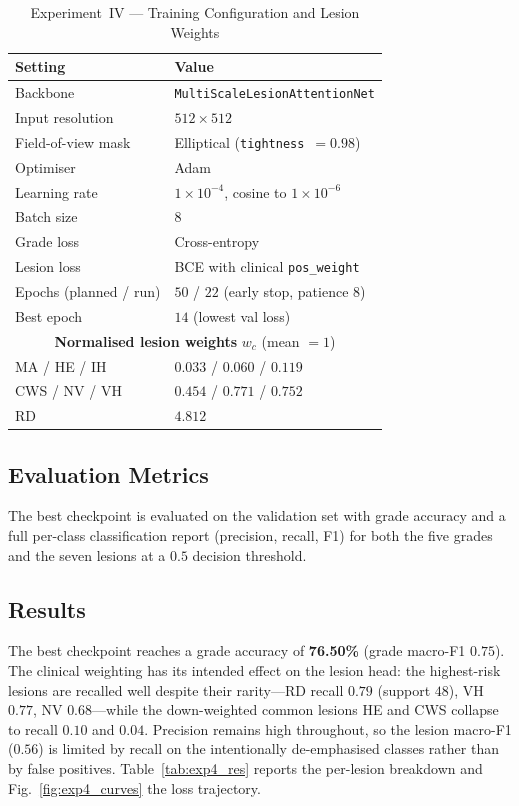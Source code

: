 \documentclass[journal,twoside,web]{ieeecolor}
\begin{document}
\begin{table}[!t]
\caption{Experiment~IV --- Training Configuration and Lesion Weights}
\label{tab:exp4_hyper}
\centering
\setlength{\tabcolsep}{5pt}
\begin{tabular}{|l|l|}
\hline
\textbf{Setting} & \textbf{Value} \\
\hline
Backbone & \texttt{MultiScaleLesionAttentionNet} \\
Input resolution & $512\times512$ \\
Field-of-view mask & Elliptical (\texttt{tightness}~$=0.98$) \\
Optimiser & Adam \\
Learning rate & $1\times10^{-4}$, cosine to $1\times10^{-6}$ \\
Batch size & $8$ \\
Grade loss & Cross-entropy \\
Lesion loss & BCE with clinical \texttt{pos\_weight} \\
Epochs (planned / run) & $50$ / $22$ (early stop, patience $8$) \\
Best epoch & $14$ (lowest val loss) \\
\hline
\multicolumn{2}{|c|}{\textbf{Normalised lesion weights} $w_c$ (mean $=1$)} \\
\hline
MA / HE / IH & $0.033$ / $0.060$ / $0.119$ \\
CWS / NV / VH & $0.454$ / $0.771$ / $0.752$ \\
RD & $4.812$ \\
\hline
\end{tabular}
\end{table}

\subsection{Evaluation Metrics}
The best checkpoint is evaluated on the validation set with grade accuracy and a
full per-class classification report (precision, recall, F1) for both the five
grades and the seven lesions at a $0.5$ decision threshold.

\subsection{Results}
The best checkpoint reaches a grade accuracy of \textbf{76.50\%} (grade macro-F1
$0.75$). The clinical weighting has its intended effect on the lesion head: the
highest-risk lesions are recalled well despite their rarity---RD recall $0.79$
(support $48$), VH $0.77$, NV $0.68$---while the down-weighted common lesions HE and
CWS collapse to recall $0.10$ and $0.04$. Precision remains high throughout, so the
lesion macro-F1 ($0.56$) is limited by recall on the intentionally de-emphasised
classes rather than by false positives. Table~\ref{tab:exp4_res} reports the
per-lesion breakdown and Fig.~\ref{fig:exp4_curves} the loss trajectory.
\end{document}
